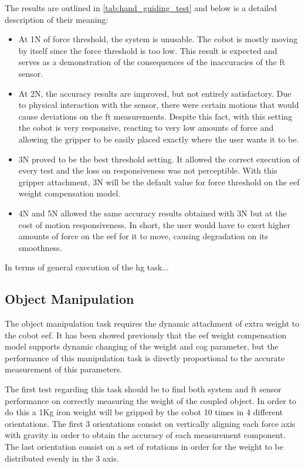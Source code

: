 
\par The results are outlined in \autoref{tab:hand_guiding_test} and below is a detailed description of their meaning:
\begin{itemize}
    \item At 1N of force threshold, the system is unusable. The cobot is mostly moving by itself since the force threshold is too low. This result is expected and serves as a demonstration of the consequences of the inaccuracies of the \ac{ft} sensor.
    \item At 2N, the accuracy results are improved, but not entirely satisfactory. Due to physical interaction with the sensor, there were certain motions that would cause deviations on the \ac{ft} measurements. Despite this fact, with this setting the cobot is very responsive, reacting to very low amounts of force and allowing the gripper to be easily placed exactly where the user wants it to be.
    \item 3N proved to be the best threshold setting. It allowed the correct execution of every test and the loss on responsiveness was not perceptible. With this gripper attachment, 3N will be the default value for force threshold on the \ac{eef} weight compensation model.
    \item 4N and 5N allowed the same accuracy results obtained with 3N but at the cost of motion responsiveness. In short, the user would have to exert higher amounts of force on the \ac{eef} for it to move, causing degradation on its smoothness.
\end{itemize}

\par In terms of general execution of the \ac{hg} task...

\subsection{Object Manipulation}

\par The object manipulation task requires the dynamic attachment of extra weight to the cobot \ac{eef}. It has been showed previously that the \ac{eef} weight compensation model supports dynamic changing of the weight and \ac{cog} parameter, but the performance of this manipulation task is directly proportional to the accurate measurement of this parameters.
\par The first test regarding this task should be to find both system and \ac{ft} sensor performance on correctly measuring the weight of the coupled object. In order to do this a 1Kg iron weight will be gripped by the cobot 10 times in 4 different orientations. The first 3 orientations consist on vertically aligning each force axis with gravity in order to obtain the accuracy of each measurement component. The last orientation consist on a set of rotations in order for the weight to be distributed evenly in the 3 axis.

